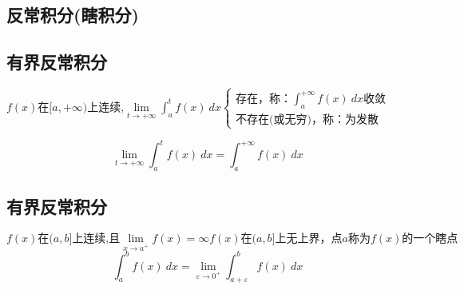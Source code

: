 \begin{center}\section{反常积分(瞎积分)}\label{chapter_definite_integral}\end{center}
\subsection{有界反常积分}
\centerline{$f(x)\mbox{在}[a,+\infty)\mbox{上连续,}\lim\limits_{t\to+\infty}\int_{a}^{t}f(x)\ dx\begin{cases}
	\mbox{存在，称：}\int_{a}^{+\infty}f(x)\ dx\mbox{收敛}\\
	\mbox{不存在(或无穷)，}\mbox{称：为发散}
\end{cases}$}\begin{flushright}
\begin{center}
	\begin{flushleft}
		\underline{\textit{\textbf{}}}
	\end{flushleft}
\end{center}
\end{flushright}
$$\lim\limits_{t\to+\infty}\int_{a}^{t}f(x)\ dx=\int_{a}^{+\infty}f(x)\ dx$$
\subsection{有界反常积分}
$f(x)\mbox{在}(a,b]\mbox{上连续,且}\lim\limits_{x\to a^+}f(x)=\infty f(x)\mbox{在}(a,b]\mbox{上无上界，点$a$称为$f(x)$的一个瞎点}$
$$\int_{a}^{b}f(x)\ dx=\lim\limits_{\varepsilon \to 0^+}\int_{a+\varepsilon}^{b}f(x)\ dx$$